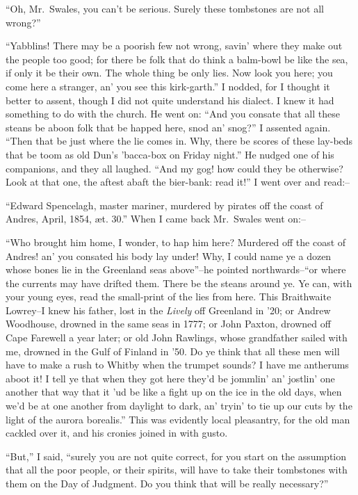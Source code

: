 \documentclass[12pt,openright]{book}
\begin{document}
“Oh, Mr. Swales, you can’t be serious. Surely these tombstones are not all wrong?”

“Yabblins! There may be a poorish few not wrong, savin’ where they make out the people too good; for there be folk that do think a balm-bowl be like the sea, if only it be their own. The whole thing be only lies. Now look you here; you come here a stranger, an’ you see this kirk-garth.” I nodded, for I thought it better to assent, though I did not quite understand his dialect. I knew it had something to do with the church. He went on: “And you consate that all these steans be aboon folk that be happed here, snod an’ snog?” I assented again. “Then that be just where the lie comes in. Why, there be scores of these lay-beds that be toom as old Dun’s ’bacca-box on Friday night.” He nudged one of his companions, and they all laughed. “And my gog! how could they be otherwise? Look at that one, the aftest abaft the bier-bank: read it!” I went over and read:–

“Edward Spencelagh, master mariner, murdered by pirates off the coast of Andres, April, 1854, æt. 30.” When I came back Mr. Swales went on:–

“Who brought him home, I wonder, to hap him here? Murdered off the coast of Andres! an’ you consated his body lay under! Why, I could name ye a dozen whose bones lie in the Greenland seas above”–he pointed northwards–“or where the currents may have drifted them. There be the steans around ye. Ye can, with your young eyes, read the small-print of the lies from here. This Braithwaite Lowrey–I knew his father, lost in the \textit{Lively} off Greenland in ’20; or Andrew Woodhouse, drowned in the same seas in 1777; or John Paxton, drowned off Cape Farewell a year later; or old John Rawlings, whose grandfather sailed with me, drowned in the Gulf of Finland in ’50. Do ye think that all these men will have to make a rush to Whitby when the trumpet sounds? I have me antherums aboot it! I tell ye that when they got here they’d be jommlin’ an’ jostlin’ one another that way that it ’ud be like a fight up on the ice in the old days, when we’d be at one another from daylight to dark, an’ tryin’ to tie up our cuts by the light of the aurora borealis.” This was evidently local pleasantry, for the old man cackled over it, and his cronies joined in with gusto.

“But,” I said, “surely you are not quite correct, for you start on the assumption that all the poor people, or their spirits, will have to take their tombstones with them on the Day of Judgment. Do you think that will be really necessary?”
\end{document}

